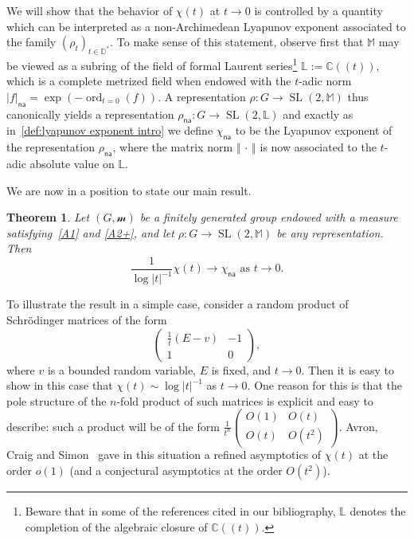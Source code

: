\documentclass[AHL,Unicode,longabstracts]{cedram}
\DeclareMathOperator{\ord}{ord}
\DeclareMathOperator{\SL}{SL}
\newcommand{\cc}{\mathbb{C}}
\newcommand{\dD}{\mathbb{D}}
\newcommand{\sm}{\mathcal{m}}
\newcommand{\cdt}{\cc(\!(t)\!)}
\newcommand{\mm}{\mathbb{M}}
\newcommand{\cv}{\rightarrow}
\newcommand{\norm}[1]{\left\Vert#1\right\Vert}
\newcommand{\abs}[1]{\left\vert#1\right\vert}
\newcommand{\Laurent}{\mathbb{L}}
\newcommand{\unsur}[1]{\frac{1}{#1}}
\newcommand{\lrpar}[1]{\left(#1\right)}
\newcommand{\na}{\mathsf{na}}
\newcommand{\inv}{^{-1}}
\newtheorem{mthm}{Theorem}
\begin{document}
We will show that the behavior of $\chi(t)$ at $t\to 0$ is controlled by a quantity which can be interpreted as a non-Archimedean Lyapunov exponent associated to the family $(\rho_t)_{t\in \dD^*}$. To make sense of this statement, observe first that $\mm$ may be viewed as a subring of the field of formal Laurent series\footnote{Beware that in some of the references cited in our bibliography, $\Laurent$ denotes the completion of the algebraic closure of $\cdt$.} $\Laurent:=\cdt$, which is a complete metrized field when endowed with the $t$-adic norm $\abs{f}_\na = \exp(-\ord_{t=0}(f))$. A representation $\rho : G \to \SL(2,\mm)$ thus canonically yields a representation $\rho_\na : G \to \SL(2,\Laurent)$ and exactly as in~\eqref{def:lyapunov exponent intro} we define $\chi_\na$ to be the Lyapunov exponent of the representation $\rho_\na$, where the matrix norm $\norm{\,\cdot\,}$ is now associated to the $t$-adic absolute value on $\Laurent$.


We are now in a position to state our main result.

\begin{mthm}\label{Thm:lyapunov na}
Let $(G, \sm)$ be a finitely generated group endowed with a measure satisfying~\eqref{A1} and \eqref{A2+}, and let $\rho: G\to \SL(2, \mm)$ be any representation. Then
\begin{equation}
\label{eq:lyapunov na}
\unsur{{\log\abs{t}\inv}}\chi(t) \longrightarrow \chi_\na \text{ as } t\cv 0.
\end{equation}
\end{mthm}


To illustrate the result in a simple case, consider a random product of Schr\"odinger matrices of the form
\begin{equation}
\label{eq:schrodinger matrix}
\begin{pmatrix} {\unsur{t}(E-v)} & -1 \\ 1 & 0
\end{pmatrix},
\end{equation}
where $v$ is a bounded random variable, $E$ is fixed, and $t\to 0$. Then it is easy to show in this case that $\chi(t)\sim \log\abs{t}\inv$ as $t\to 0$. One reason for this is that the pole structure of the $n$-fold product of such matrices is explicit and easy to describe: such a product will be of the form $\unsur{t^n}\lrpar{
\begin{smallmatrix} O(1) & O(t) \\ O(t) & O(t^2)
\end{smallmatrix}}$.
Avron, Craig and Simon~\cite{avron-craig-simon} gave in this situation a refined asymptotics of $\chi(t)$ at the order $o(1)$ (and a conjectural asymptotics at the order $O(t^{2})$).
\end{document}
